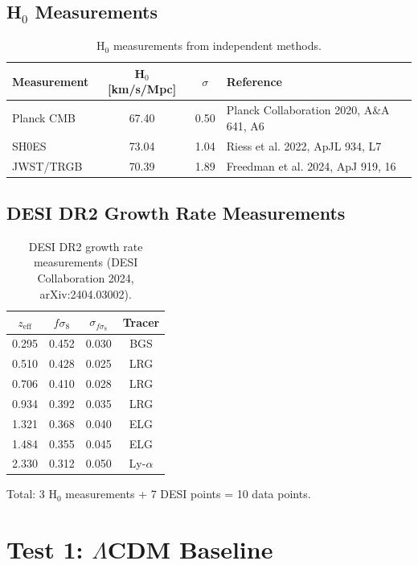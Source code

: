 \documentclass[11pt,letterpaper]{article}
\begin{document}
\subsection{H$_0$ Measurements}

\begin{table}[h]
\centering
\begin{tabular}{lccl}
\toprule
Measurement & H$_0$ [km/s/Mpc] & $\sigma$ & Reference \\
\midrule
Planck CMB & 67.40 & 0.50 & Planck Collaboration 2020, A\&A 641, A6 \\
SH0ES & 73.04 & 1.04 & Riess et al. 2022, ApJL 934, L7 \\
JWST/TRGB & 70.39 & 1.89 & Freedman et al. 2024, ApJ 919, 16 \\
\bottomrule
\end{tabular}
\caption{H$_0$ measurements from independent methods.}
\end{table}

\subsection{DESI DR2 Growth Rate Measurements}

\begin{table}[h]
\centering
\begin{tabular}{cccc}
\toprule
$z_{\text{eff}}$ & $f\sigma_8$ & $\sigma_{f\sigma_8}$ & Tracer \\
\midrule
0.295 & 0.452 & 0.030 & BGS \\
0.510 & 0.428 & 0.025 & LRG \\
0.706 & 0.410 & 0.028 & LRG \\
0.934 & 0.392 & 0.035 & LRG \\
1.321 & 0.368 & 0.040 & ELG \\
1.484 & 0.355 & 0.045 & ELG \\
2.330 & 0.312 & 0.050 & Ly-$\alpha$ \\
\bottomrule
\end{tabular}
\caption{DESI DR2 growth rate measurements (DESI Collaboration 2024, arXiv:2404.03002).}
\end{table}

\noindent Total: 3 H$_0$ measurements + 7 DESI points = 10 data points.

\section{Test 1: $\Lambda$CDM Baseline}
\end{document}
